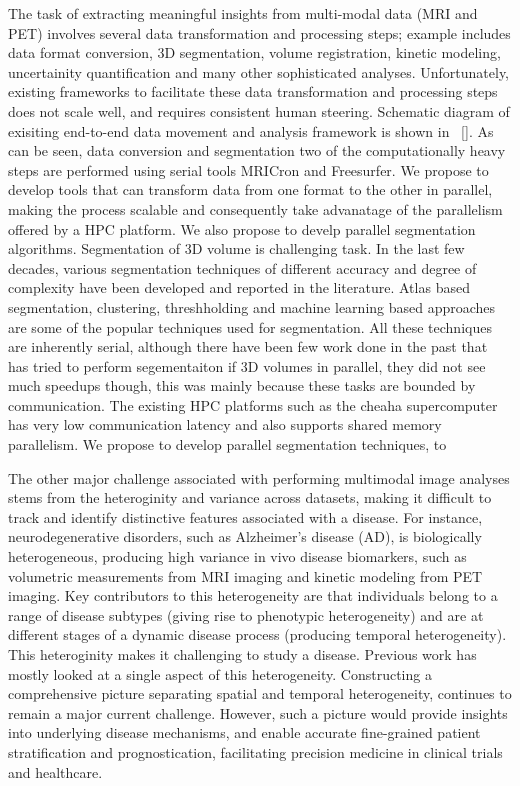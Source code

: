 \documentclass[11pt]{article}
\begin{document}
The task of extracting meaningful insights from multi-modal data (MRI and PET) involves several data transformation and processing steps;
example includes data format conversion, 3D segmentation, volume registration, kinetic modeling, uncertainity quantification and many other sophisticated analyses.
Unfortunately, existing frameworks to facilitate these data transformation and processing steps does not scale well, and requires consistent human steering. 
Schematic diagram of exisiting end-to-end data movement and analysis framework is shown in ~\ref{}. As can be seen, data conversion and segmentation two of the computationally heavy steps are performed using serial tools MRICron and Freesurfer. We propose to develop tools that can transform data from one format to the other in parallel, making the process scalable and consequently take advanatage of the parallelism offered by a HPC platform. We also propose to develp parallel segmentation algorithms. Segmentation of 3D volume is challenging task.
In the last few decades, various segmentation techniques of different accuracy and degree of complexity have been developed and reported in the literature. Atlas based segmentation, clustering, threshholding and machine learning based approaches are some of the popular techniques used for segmentation. All these techniques are inherently serial, although there have been few work done in the past that has tried to perform segementaiton if 3D volumes in parallel, they did not see much speedups though, this was mainly because these tasks are bounded by communication. The existing HPC platforms such as the cheaha supercomputer has very low communication latency and also supports shared memory parallelism. We propose to develop parallel segmentation techniques, to 

The other major challenge associated with performing multimodal image analyses stems from the heteroginity and variance across datasets, making it difficult to track and identify distinctive features associated with a disease. For instance, neurodegenerative disorders, such as Alzheimer’s disease (AD), is biologically heterogeneous, producing high variance in vivo disease biomarkers, 
such as volumetric measurements from MRI imaging and kinetic modeling from PET imaging. Key contributors to this heterogeneity are that individuals belong to a range of disease subtypes (giving rise to phenotypic heterogeneity) and are at different stages of a dynamic disease process (producing temporal heterogeneity). This heteroginity makes it challenging to study a disease.
Previous work has mostly looked at a single aspect of this heterogeneity. Constructing a comprehensive picture separating spatial and temporal heterogeneity, continues to remain a major current challenge. However, such a picture would provide insights into underlying disease mechanisms, and enable accurate fine-grained patient stratification and prognostication, facilitating precision medicine in clinical trials and healthcare.
\end{document}

